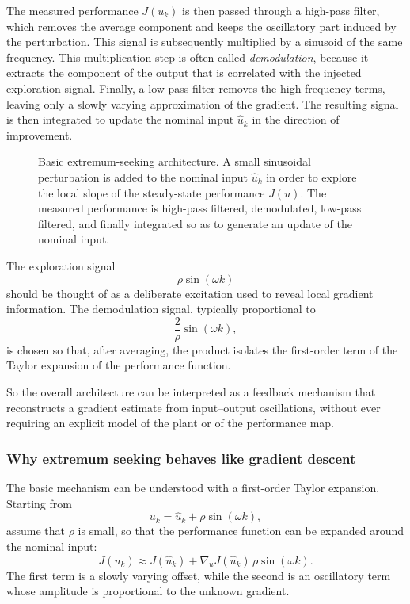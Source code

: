 The measured performance $J(u_k)$ is then passed through a high-pass filter, which removes the average component and keeps the oscillatory part induced by the perturbation. This signal is subsequently multiplied by a sinusoid of the same frequency. This multiplication step is often called \emph{demodulation}, because it extracts the component of the output that is correlated with the injected exploration signal. Finally, a low-pass filter removes the high-frequency terms, leaving only a slowly varying approximation of the gradient. The resulting signal is then integrated to update the nominal input $\hat u_k$ in the direction of improvement.

\begin{figure}[!h]
    \centering
    
    \caption{Basic extremum-seeking architecture. A small sinusoidal perturbation is added to the nominal input $\hat u_k$ in order to explore the local slope of the steady-state performance $J(u)$. The measured performance is high-pass filtered, demodulated, low-pass filtered, and finally integrated so as to generate an update of the nominal input.}
    \label{fig:extremum-seeking-architecture}
\end{figure}

The exploration signal
\[
\rho \sin(\omega k)
\]
should be thought of as a deliberate excitation used to reveal local gradient information. The demodulation signal, typically proportional to
\[
\frac{2}{\rho}\sin(\omega k),
\]
is chosen so that, after averaging, the product isolates the first-order term of the Taylor expansion of the performance function.

So the overall architecture can be interpreted as a feedback mechanism that reconstructs a gradient estimate from input--output oscillations, without ever requiring an explicit model of the plant or of the performance map.

\subsubsection{Why extremum seeking behaves like gradient descent}

The basic mechanism can be understood with a first-order Taylor expansion. Starting from
\[
u_k=\hat u_k+\rho \sin(\omega k),
\]
assume that $\rho$ is small, so that the performance function can be expanded around the nominal input:
\[
J(u_k)\approx J(\hat u_k)+\nabla_u J(\hat u_k)\,\rho \sin(\omega k).
\]
The first term is a slowly varying offset, while the second is an oscillatory term whose amplitude is proportional to the unknown gradient.

